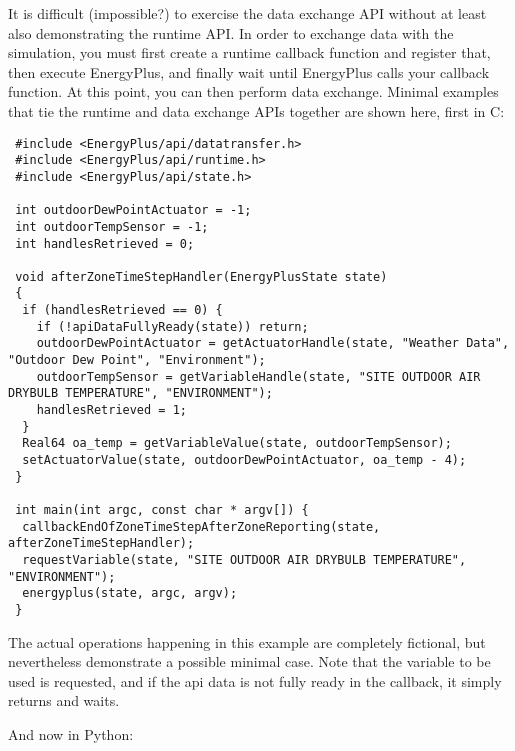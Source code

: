 It is difficult (impossible?) to exercise the data exchange API without at least also demonstrating the runtime API.
In order to exchange data with the simulation, you must first create a runtime callback function and register that, then execute EnergyPlus, and finally wait until EnergyPlus calls your callback function.
At this point, you can then perform data exchange.
Minimal examples that tie the runtime and data exchange APIs together are shown here, first in C:

\begin{lstlisting}
 #include <EnergyPlus/api/datatransfer.h>
 #include <EnergyPlus/api/runtime.h>
 #include <EnergyPlus/api/state.h>

 int outdoorDewPointActuator = -1;
 int outdoorTempSensor = -1;
 int handlesRetrieved = 0;

 void afterZoneTimeStepHandler(EnergyPlusState state)
 {
  if (handlesRetrieved == 0) {
    if (!apiDataFullyReady(state)) return;
    outdoorDewPointActuator = getActuatorHandle(state, "Weather Data", "Outdoor Dew Point", "Environment");
    outdoorTempSensor = getVariableHandle(state, "SITE OUTDOOR AIR DRYBULB TEMPERATURE", "ENVIRONMENT");
    handlesRetrieved = 1;
  }
  Real64 oa_temp = getVariableValue(state, outdoorTempSensor);
  setActuatorValue(state, outdoorDewPointActuator, oa_temp - 4);
 }

 int main(int argc, const char * argv[]) {
  callbackEndOfZoneTimeStepAfterZoneReporting(state, afterZoneTimeStepHandler);
  requestVariable(state, "SITE OUTDOOR AIR DRYBULB TEMPERATURE", "ENVIRONMENT");
  energyplus(state, argc, argv);
 }
\end{lstlisting}

The actual operations happening in this example are completely fictional, but nevertheless demonstrate a possible minimal case.
Note that the variable to be used is requested, and if the api data is not fully ready in the callback, it simply returns and waits.

And now in Python:

